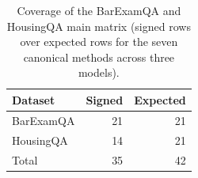 \begin{table}[H]
\centering
\caption{Coverage of the BarExamQA and HousingQA main matrix (signed rows over expected rows for the seven canonical methods across three models).}
\label{tab:coverage}
\small
\begin{tabular}{lrr}
\toprule
Dataset & Signed & Expected \\
\midrule
BarExamQA & 21 & 21 \\
HousingQA & 14 & 21 \\
\midrule
Total & 35 & 42 \\
\bottomrule
\end{tabular}
\end{table}
